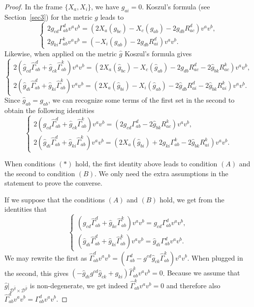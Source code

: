 \documentclass[11pt]{article}
\def\D{{\mathcal D}}
\begin{document}
\begin{proof} 
In the frame $\{X_a,X_i\}$, we have $g_{ai}=0$.  Koszul's  formula (see Section~\ref{sec3}) for the metric $g$ leads to  
$$
\left\{\begin{array}{l}
2g_{c d} \Gamma_{a b}^dv^a v^b =(2X_a\left(g_{b c}\right)-X_c\left(g_{a b}\right)-2g_{d b} R_{a c}^d) v^av^b,\\
2g_{ki} \Gamma_{a b}^kv^a v^b =(-X_i\left(g_{ab}\right)-2g_{d b} R_{a i}^d) v^av^b.
\end{array}\right.
$$
Likewise, when applied on the metric $\hat{g}$ Koszul's formula gives
$$
\left\{\begin{array}{l}
2(\hat{g}_{c d} \hat{\Gamma}_{a b}^d+\hat{g}_{ck}\hat{\Gamma}^k_{ab})v^a v^b =(2X_a\left(\hat{g}_{b c}\right) -X_c\left(\hat{g}_{a b}\right)-2\hat{g}_{d b} R_{a c}^d 
-2\hat{g}_{bk}R^k_{ac}) v^av^b,\\
2(\hat{g}_{di} \hat{\Gamma}_{a b}^d+\hat{g}_{ki}\hat{\Gamma}^k_{ab})v^a v^b =(2X_a\left(\hat{g}_{b i}\right) -X_i\left(\hat{g}_{a b}\right)-2\hat{g}_{d b} R_{a i}^d 
-2\hat{g}_{bk}R^k_{ai}) v^av^b.
\end{array}\right.$$
Since $\hat{g}_{ab}=g_{ab}$,  we can recognize some terms of the first set in the second to obtain the following identities
\[
\begin{cases}
2({g}_{c d} \hat{\Gamma}_{a b}^d+\hat{g}_{ck}\hat{\Gamma}^k_{ab})v^a v^b =(2{g}_{c d} {\Gamma}_{a b}^d -2\hat{g}_{bk}R^k_{ac}) v^av^b,\\
2(\hat{g}_{di} \hat{\Gamma}_{a b}^d+\hat{g}_{ki}\hat{\Gamma}^k_{ab})v^a v^b =(2X_a\left(\hat{g}_{b i}\right)+2g_{ki} \Gamma_{a b}^k-2\hat{g}_{bk}R^k_{ai}) v^av^b.\end{cases}
\]

When conditions $(*)$ hold, the first identity above leads to condition $(A)$ and the second to condition $(B)$. 
We only need the extra assumptions in the statement to prove the converse. 

If we suppose that the conditions $(A)$ and $(B)$ hold, we get from the identities that
\[\begin{cases}
({g}_{c d} \hat{\Gamma}_{a b}^d+\hat{g}_{kc}\hat{\Gamma}^k_{ab})v^a v^b ={g}_{c d} {\Gamma}_{a b}^d v^av^b,\\
(\hat{g}_{di} \hat{\Gamma}_{a b}^d+\hat{g}_{ki}\hat{\Gamma}^k_{ab})v^a v^b =\hat{g}_{di}  {\Gamma}_{a b}^d  v^av^b.\end{cases}\nonumber
\]
We may rewrite the first as $\hat{\Gamma}_{a b}^dv^a v^b =  ({\Gamma}_{a b}^d - {g}^{c d}  \hat{g}_{ck}\hat{\Gamma}^k_{ab})v^av^b$. When plugged in the second, this gives $ (- \hat{g}_{di}{g}^{c d}  \hat{g}_{ck}+\hat{g}_{ki})\hat{\Gamma}^k_{ab}v^a v^b =0$. {Because we assume that $\hat{g}|_{\D^{\hat{g}}\times\D^{\hat{g}}}$ is non-degenerate,} we get indeed $\hat{\Gamma}^k_{ab}v^a v^b =0$ and therefore also $\hat{\Gamma}_{a b}^dv^a v^b =  {\Gamma}_{a b}^dv^av^b$.


\end{proof}
\end{document}
